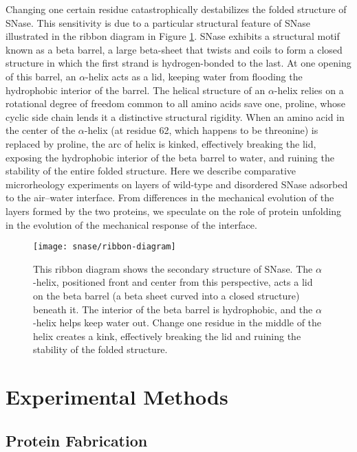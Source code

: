 Changing one certain residue catastrophically destabilizes the folded structure of SNase. This sensitivity is due to a particular structural feature of SNase illustrated in the ribbon diagram in Figure \ref{fig:ribbon-diagram}. SNase exhibits a structural motif known as a beta barrel, a large beta-sheet that twists and coils to form a closed structure in which the first strand is hydrogen-bonded to the last. At one opening of this barrel, an $\alpha$-helix acts as a lid, keeping water from flooding the hydrophobic interior of the barrel. The helical structure of an $\alpha$-helix relies on a rotational degree of freedom common to all amino acids save one, proline, whose cyclic side chain lends it a distinctive structural rigidity. When an amino acid in the center of the $\alpha$-helix (at residue 62, which happens to be threonine) is replaced by proline, the arc of helix is kinked, effectively breaking the lid, exposing the hydrophobic interior of the beta barrel to water, and ruining the stability of the entire folded structure. Here we describe comparative microrheology experiments on layers of wild-type and disordered SNase adsorbed to the air--water interface. From differences in the mechanical evolution of the layers formed by the two proteins, we speculate on the role of protein unfolding in the evolution of the mechanical response of the interface.

\begin{figure}
 \texttt{[image: snase/ribbon-diagram]}
 \caption[Ribbon diagram of Wild-Type SNase]{\label{fig:ribbon-diagram}This ribbon diagram shows the secondary structure of SNase. The $\alpha$-helix, positioned front and center from this perspective, acts a lid on the beta barrel (a beta sheet curved into a closed structure) beneath it. The interior of the beta barrel is hydrophobic, and the $\alpha$-helix helps keep water out. Change one residue in the middle of the helix creates a kink, effectively breaking the lid and ruining the stability of the folded structure.}
\end{figure}

\section{Experimental Methods}

\subsection{Protein Fabrication}

